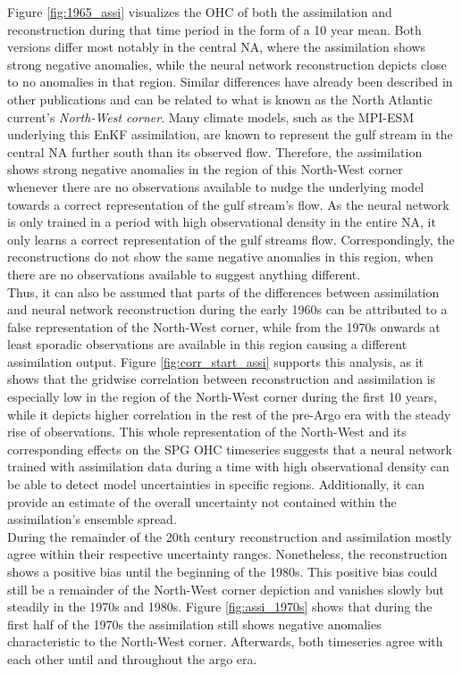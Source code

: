 \documentclass[Masterarbeit.tex]{subfile}
\begin{document}
	
	Figure \ref{fig:1965_assi} visualizes the OHC of both the assimilation and reconstruction during that time period in the form of a 10 year mean. Both versions differ most notably in the central NA, where the assimilation shows strong negative anomalies, while the neural network reconstruction depicts close to no anomalies in that region. Similar differences have already been described in other publications and can be related to what is known as the North Atlantic current's \textit{North-West corner}. Many climate models, such as the MPI-ESM underlying this EnKF assimilation, are known to represent the gulf stream in the central NA further south than its observed flow. Therefore, the assimilation shows strong negative anomalies in the region of this North-West corner whenever there are no observations available to nudge the underlying model towards a correct representation of the gulf stream's flow. As the neural network is only trained in a period with high observational density in the entire NA, it only learns a correct representation of the gulf streams flow. Correspondingly, the reconstructions do not show the same negative anomalies in this region, when there are no observations available to suggest anything different.\\
	
	Thus, it can also be assumed that parts of the differences between assimilation and neural network reconstruction during the early 1960s can be attributed to a false representation of the North-West corner, while from the 1970s onwards at least sporadic observations are available in this region causing a different assimilation output. Figure \ref{fig:corr_start_assi} supports this analysis, as it shows that the gridwise correlation between reconstruction and assimilation is especially low in the region of the North-West corner during the first 10 years, while it depicts higher correlation in the rest of the pre-Argo era with the steady rise of observations. This whole representation of the North-West and its corresponding effects on the SPG OHC timeseries suggests that a neural network trained with assimilation data during a time with high observational density can be able to detect model uncertainties in specific regions. Additionally, it can provide an estimate of the overall uncertainty not contained within the assimilation's ensemble spread. \\
	During the remainder of the 20th century reconstruction and assimilation mostly agree within their respective uncertainty ranges. Nonetheless, the reconstruction shows a positive bias until the beginning of the 1980s. This positive bias could still be a remainder of the North-West corner depiction and vanishes slowly but steadily in the 1970s and 1980s. Figure \ref{fig:assi_1970s} shows that during the first half of the 1970s the assimilation still shows negative anomalies characteristic to the North-West corner. Afterwards, both timeseries agree with each other until and throughout the argo era. \\
	
\end{document}
